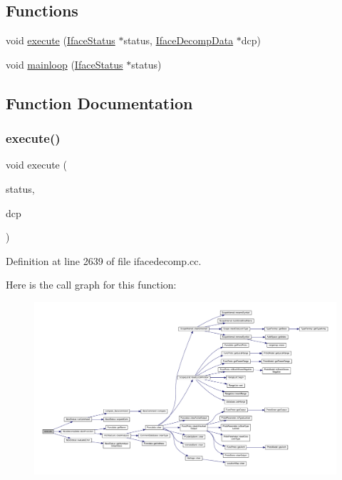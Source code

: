 \subsection*{Functions}
\begin{DoxyCompactItemize}
\item 
void \mbox{\hyperlink{ifacedecomp_8hh_a613e6f3576092d815632ad7329d741e7}{execute}} (\mbox{\hyperlink{class_iface_status}{Iface\+Status}} $\ast$status, \mbox{\hyperlink{class_iface_decomp_data}{Iface\+Decomp\+Data}} $\ast$dcp)
\item 
void \mbox{\hyperlink{ifacedecomp_8hh_ac71bcb680ffca9a7d79b5ba44be1f612}{mainloop}} (\mbox{\hyperlink{class_iface_status}{Iface\+Status}} $\ast$status)
\end{DoxyCompactItemize}


\subsection{Function Documentation}
\mbox{\label{ifacedecomp_8hh_a613e6f3576092d815632ad7329d741e7}} 
\subsubsection{\texorpdfstring{execute()}{execute()}}
{\footnotesize\ttfamily void execute (\begin{DoxyParamCaption}\item[{\mbox{\hyperlink{class_iface_status}{Iface\+Status}} $\ast$}]{status,  }\item[{\mbox{\hyperlink{class_iface_decomp_data}{Iface\+Decomp\+Data}} $\ast$}]{dcp }\end{DoxyParamCaption})}



Definition at line 2639 of file ifacedecomp.\+cc.

Here is the call graph for this function\+:
\nopagebreak
\begin{figure}[H]
\begin{center}
\leavevmode
\includegraphics[width=350pt]{ifacedecomp_8hh_a613e6f3576092d815632ad7329d741e7_cgraph}
\end{center}
\end{figure}
\mbox{\label{ifacedecomp_8hh_ac71bcb680ffca9a7d79b5ba44be1f612}} 
